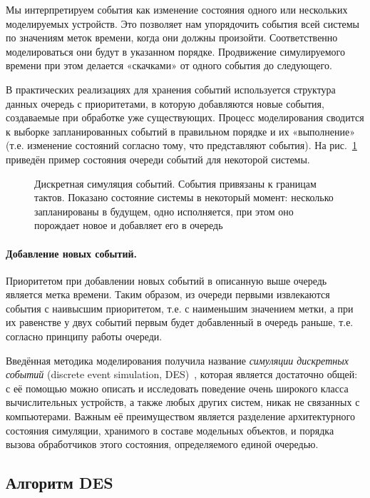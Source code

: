 Мы интерпретируем события как изменение состояния одного или нескольких моделируемых устройств. Это позволяет нам упорядочить события всей системы по значениям меток времени, когда они должны произойти. Соответственно моделироваться они будут в указанном порядке. Продвижение симулируемого времени при этом делается «скачками» от одного события до следующего.

В практических реализациях для хранения событий используется структура данных очередь с приоритетами, в которую добавляются новые события, создаваемые при обработке уже существующих. Процесс моделирования сводится к выборке запланированных событий в правильном порядке и их «выполнение» (т.е. изменение состояний согласно тому, что представляют события). На рис.~\ref{fig:queue1} приведён пример состояния очереди событий для некоторой системы.  

\begin{figure}[htp]
    \centering
    \caption[Дискретная симуляция событий]{Дискретная симуляция событий. События привязаны к границам тактов. Показано состояние системы в некоторый момент: несколько запланированы в будущем, одно исполняется, при этом оно порождает новое и добавляет его в очередь}
    \label{fig:queue1}
\end{figure}

\paragraph{Добавление новых событий.} Приоритетом при добавлении новых событий в описанную выше очередь является метка времени. Таким образом, из очереди первыми извлекаются события с наивысшим приоритетом, т.е. с наименьшим значением метки, а при их равенстве у двух событий первым будет добавленный в очередь раньше, т.е. согласно принципу работы очереди.

Введённая методика моделирования получила название \textit{симуляции дискретных событий} (\abbr discrete event simulation, DES)~\cite{fujimoto-parallel-dist-sim, introduction-to-des, Cain02preciseand}, которая является достаточно общей: с её помощью можно описать и исследовать поведение очень широкого класса вычислительных устройств, а также любых других систем, никак не связанных с компьютерами. Важным её преимуществом является разделение архитектурного состояния симуляции, хранимого в составе модельных объектов, и порядка вызова обработчиков этого состояния, определяемого единой очередью.

\subsection{Алгоритм DES}

